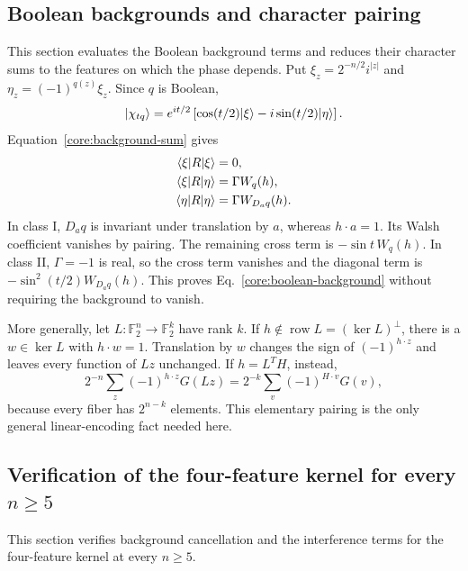 

\subsection{Boolean backgrounds and character pairing}
\label{core:pairing}

This section evaluates the Boolean background terms and reduces their character sums to the features on which the phase depends. Put $\xi_z=2^{-n/2}i^{|z|}$ and $\eta_z=(-1)^{q(z)}\xi_z$. Since $q$ is Boolean,
\begin{equation}
 \lvert \chi_{tq}\rangle=e^{it/2}
 \left[\cos(t/2)\lvert \xi\rangle-i\sin(t/2)\lvert \eta\rangle\right].
\end{equation}
Equation~\eqref{core:background-sum} gives
\begin{align}
 \langle \xi\rvert R\lvert \xi\rangle&=0,\nonumber\\
 \langle \xi\rvert R\lvert \eta\rangle&=\Gamma W_q(h),\nonumber\\
 \langle \eta\rvert R\lvert \eta\rangle&=\Gamma W_{D_aq}(h).
\end{align}
In class I, $D_aq$ is invariant under translation by $a$, whereas $h\cdot a=1$. Its Walsh coefficient vanishes by pairing. The remaining cross term is $-\sin t\,W_q(h)$. In class II, $\Gamma=-1$ is real, so the cross term vanishes and the diagonal term is $-\sin^2(t/2)W_{D_aq}(h)$. This proves Eq.~\eqref{core:boolean-background} without requiring the background to vanish.

More generally, let $L:\mathbb F_2^n\to\mathbb F_2^k$ have rank $k$. If $h\notin\operatorname{row}L=(\ker L)^\perp$, there is a $w\in\ker L$ with $h\cdot w=1$. Translation by $w$ changes the sign of $(-1)^{h\cdot z}$ and leaves every function of $Lz$ unchanged. If $h=L^TH$, instead,
\begin{equation}
 2^{-n}\sum_z(-1)^{h\cdot z}G(Lz)
 =2^{-k}\sum_v(-1)^{H\cdot v}G(v),
 \label{core:compression}
\end{equation}
because every fiber has $2^{n-k}$ elements. This elementary pairing is the only general linear-encoding fact needed here.

\subsection{Verification of the four-feature kernel for every \texorpdfstring{$n\ge5$}{n >= 5}}
\label{core:alln-classification}

This section verifies background cancellation and the interference terms for the four-feature kernel at every $n\ge5$.

